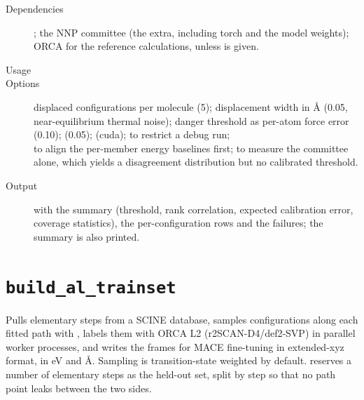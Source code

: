 \begin{description}
  \item[Dependencies] ; the NNP committee (the \code{[nnp]}
        extra, including torch and the model weights); ORCA for the
        reference calculations, unless  is given.
  \item[Usage] 
  \item[Options]  displaced configurations per molecule (5);
         displacement width in \AA{} (0.05, near-equilibrium
        thermal noise);  danger threshold as per-atom force
        error (0.10);  (0.05); 
        (cuda);  to restrict a debug run; \\
         to align the per-member energy
        baselines first;  to measure the committee alone,
        which yields a disagreement distribution but no calibrated
        threshold.
  \item[Output]  with the summary (threshold,
        rank correlation, expected calibration error, coverage statistics),
        the per-configuration rows and the failures; the summary is also
        printed.
\end{description}

\section{\texttt{build\_al\_trainset}}

Pulls elementary steps from a SCINE database, samples configurations along
each fitted path with , labels them with ORCA L2
(r2SCAN-D4/def2-SVP) in parallel worker processes, and writes the frames for
MACE fine-tuning in extended-xyz format, in eV and \AA.  Sampling is
transition-state weighted by default.   reserves a number
of elementary steps as the held-out set, split by step so that no path point
leaks between the two sides.


